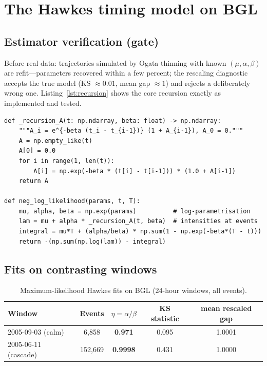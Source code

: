 \documentclass[11pt,a4paper]{report}
\newcommand{\ours}[1]{{\color{good}\textbf{#1}}}
\begin{document}
\section{The Hawkes timing model on BGL}
\label{sec:impl-hawkes}

\subsection{Estimator verification (gate)}
Before real data: trajectories simulated by Ogata thinning with known
$(\mu,\alpha,\beta)$ are refit---parameters recovered within a few
percent; the rescaling diagnostic accepts the true model
(KS $\approx0.01$, mean gap $\approx1$) and rejects a deliberately wrong
one. Listing~\ref{lst:recursion} shows the core recursion exactly as
implemented and tested.

\begin{lstlisting}[caption={The $O(n)$ likelihood recursion (project source).},
label={lst:recursion}]
def _recursion_A(t: np.ndarray, beta: float) -> np.ndarray:
    """A_i = e^{-beta (t_i - t_{i-1})} (1 + A_{i-1}), A_0 = 0."""
    A = np.empty_like(t)
    A[0] = 0.0
    for i in range(1, len(t)):
        A[i] = np.exp(-beta * (t[i] - t[i-1])) * (1.0 + A[i-1])
    return A

def neg_log_likelihood(params, t, T):
    mu, alpha, beta = np.exp(params)          # log-parametrisation
    lam = mu + alpha * _recursion_A(t, beta)  # intensities at events
    integral = mu*T + (alpha/beta) * np.sum(1 - np.exp(-beta*(T - t)))
    return -(np.sum(np.log(lam)) - integral)
\end{lstlisting}

\subsection{Fits on contrasting windows}
\begin{table}[H]
\centering
\caption{Maximum-likelihood Hawkes fits on BGL (24-hour windows, all
events).}
\label{tab:hawkes}
\small
\renewcommand{\arraystretch}{1.25}
\begin{tabular}{@{}l c c c c@{}}
\toprule
Window & Events & $\eta=\alpha/\beta$ & KS statistic & mean rescaled gap \\
\midrule
2005-09-03 (calm) & 6{,}858 & \ours{0.971} & 0.095 & 1.0001 \\
2005-06-11 (cascade) & 152{,}669 & \ours{0.9998} & 0.431 & 1.0000 \\
\bottomrule
\end{tabular}
\end{table}
\end{document}
